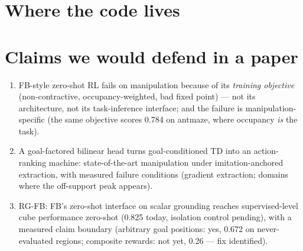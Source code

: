 \documentclass[11pt]{article}
\begin{document}
\section{Where the code lives}
\begin{center}\end{center}

\section{Claims we would defend in a paper}
\begin{enumerate}[leftmargin=1.6em,itemsep=2pt]
\item FB-style zero-shot RL fails on manipulation because of its \emph{training objective}
(non-contractive, occupancy-weighted, bad fixed point) --- not its architecture, not its
task-inference interface; and the failure is manipulation-specific (the same objective scores
0.784 on antmaze, where occupancy \emph{is} the task).
\item A goal-factored bilinear head turns goal-conditioned TD into an action-ranking machine:
state-of-the-art manipulation under imitation-anchored extraction, with measured failure
conditions (gradient extraction; domains where the off-support peak appears).
\item RG-FB: FB's zero-shot interface on scalar grounding reaches supervised-level cube
performance zero-shot (0.825 today, isolation control pending), with a measured claim
boundary (arbitrary goal positions: yes, 0.672 on never-evaluated regions; composite rewards:
not yet, 0.26 --- fix identified).
\end{enumerate}
\end{document}
